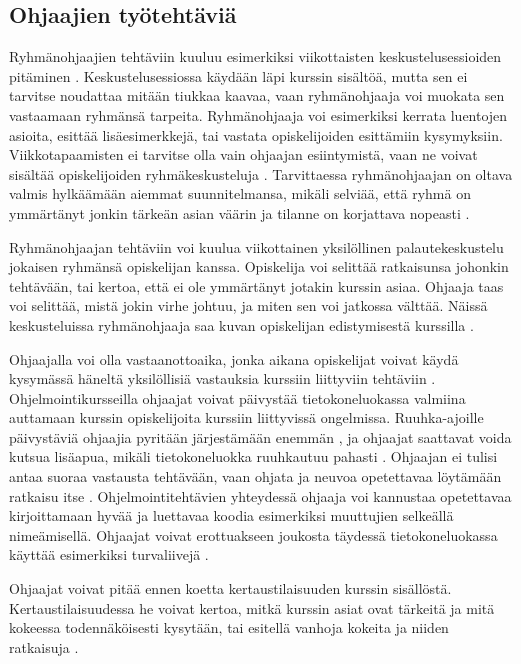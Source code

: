 \documentclass[finnish]{tktltiki2}
\theoremstyle{definition}
\theoremstyle{remark}
\begin{document}
\subsection{Ohjaajien työtehtäviä}

Ryhmänohjaajien tehtäviin kuuluu esimerkiksi viikottaisten keskustelusessioiden pitäminen \cite{Reges88}. Keskustelusessiossa käydään läpi kurssin sisältöä, mutta sen ei tarvitse noudattaa mitään tiukkaa kaavaa, vaan ryhmänohjaaja voi muokata sen vastaamaan ryhmänsä tarpeita. Ryhmänohjaaja voi esimerkiksi kerrata luentojen asioita, esittää lisäesimerkkejä, tai vastata opiskelijoiden esittämiin kysymyksiin. Viikkotapaamisten ei tarvitse olla vain ohjaajan esiintymistä, vaan ne voivat sisältää opiskelijoiden ryhmäkeskusteluja \cite{Decker06}. Tarvittaessa ryhmänohjaajan on oltava valmis hylkäämään aiemmat suunnitelmansa, mikäli selviää, että ryhmä on ymmärtänyt jonkin tärkeän asian väärin ja tilanne on korjattava nopeasti \cite{Reges88}. \par

Ryhmänohjaajan tehtäviin voi kuulua viikottainen yksilöllinen palautekeskustelu jokaisen ryhmänsä opiskelijan kanssa. Opiskelija voi selittää ratkaisunsa johonkin tehtävään, tai kertoa, että ei ole ymmärtänyt jotakin kurssin asiaa. Ohjaaja taas voi selittää, mistä jokin virhe johtuu, ja miten sen voi jatkossa välttää. Näissä keskusteluissa ryhmänohjaaja saa kuvan opiskelijan edistymisestä kurssilla \cite{Reges88,Reges03}.  \par

Ohjaajalla voi olla vastaanottoaika, jonka aikana opiskelijat voivat käydä kysymässä häneltä yksilöllisiä vastauksia kurssiin liittyviin tehtäviin \cite{Decker06}. Ohjelmointikursseilla ohjaajat voivat päivystää tietokoneluokassa valmiina auttamaan kurssin opiskelijoita kurssiin liittyvissä ongelmissa. Ruuhka-ajoille päivystäviä ohjaajia pyritään järjestämään enemmän \cite{Reges88, Reges03}, ja ohjaajat saattavat voida kutsua lisäapua, mikäli tietokoneluokka ruuhkautuu pahasti \cite{Kurhila11}. Ohjaajan ei tulisi antaa suoraa vastausta tehtävään, vaan ohjata ja neuvoa opetettavaa löytämään ratkaisu itse \cite{Vikberg, Kurhila11}. Ohjelmointitehtävien yhteydessä ohjaaja voi kannustaa opetettavaa kirjoittamaan hyvää ja luettavaa koodia esimerkiksi muuttujien selkeällä nimeämisellä. Ohjaajat voivat erottuakseen joukosta täydessä tietokoneluokassa käyttää esimerkiksi turvaliivejä \cite{Vihavainen}.  \par

Ohjaajat voivat pitää ennen koetta kertaustilaisuuden kurssin sisällöstä. Kertaustilaisuudessa he voivat kertoa, mitkä kurssin asiat ovat tärkeitä ja mitä kokeessa todennäköisesti kysytään, tai esitellä vanhoja kokeita ja niiden ratkaisuja \cite{Decker06}. \par
\end{document}
